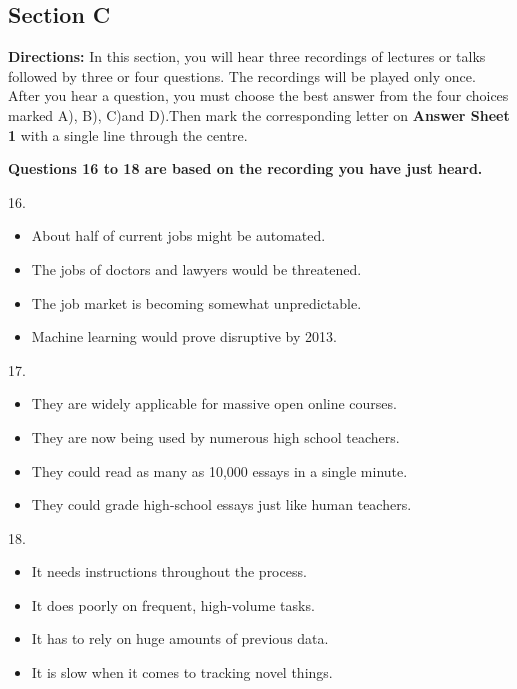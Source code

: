 \documentclass[UTF8,11pt]{ctexart}
\begin{document}
\subsection*{\textbf{Section C}}


\textbf{Directions:} In this section, you will hear three recordings of lectures or talks followed by three or four questions. The recordings will be played only once. After you hear a question, you must choose the best answer from the four choices marked A), B), C)and D).Then mark the corresponding letter on\textbf{ Answer Sheet 1} with a single line through the centre.


\textbf{Questions 16 to 18 are based on the recording you have just heard.}


16.


\begin{itemize}[leftmargin=2em,itemsep=.2em,topsep=.4em]\item[A.] About half of current jobs might be automated.
\item[B.] The jobs of doctors and lawyers would be threatened.
\item[C.] The job market is becoming somewhat unpredictable.
\item[D.] Machine learning would prove disruptive by 2013.
\end{itemize}

17.


\begin{itemize}[leftmargin=2em,itemsep=.2em,topsep=.4em]\item[A.] They are widely applicable for massive open online courses.
\item[B.] They are now being used by numerous high school teachers.
\item[C.] They could read as many as 10,000 essays in a single minute.
\item[D.] They could grade high-school essays just like human teachers.
\end{itemize}

18.


\begin{itemize}[leftmargin=2em,itemsep=.2em,topsep=.4em]\item[A.] It needs instructions throughout the process.
\item[B.] It does poorly on frequent, high-volume tasks.
\item[C.] It has to rely on huge amounts of previous data.
\item[D.] It is slow when it comes to tracking novel things.
\end{itemize}
\end{document}

